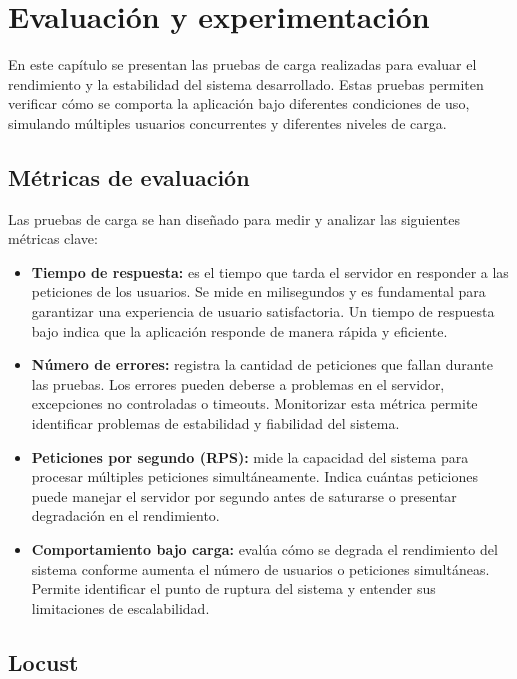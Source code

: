 \chapter{Evaluación y experimentación}

En este capítulo se presentan las pruebas de carga realizadas para evaluar el rendimiento y la estabilidad del sistema desarrollado. Estas pruebas permiten verificar 
cómo se comporta la aplicación bajo diferentes condiciones de uso, simulando múltiples usuarios concurrentes y diferentes niveles de carga.

\section{Métricas de evaluación}

Las pruebas de carga se han diseñado para medir y analizar las siguientes métricas clave:

\begin{itemize}
    \item \textbf{Tiempo de respuesta:} es el tiempo que tarda el servidor en responder a las peticiones de los usuarios. Se mide en milisegundos y es fundamental para 
    garantizar una experiencia de usuario satisfactoria. Un tiempo de respuesta bajo indica que la aplicación responde de manera rápida y eficiente.
    
    \item \textbf{Número de errores:} registra la cantidad de peticiones que fallan durante las pruebas. Los errores pueden deberse a problemas en el servidor, excepciones 
    no controladas o timeouts. Monitorizar esta métrica permite identificar problemas de estabilidad y fiabilidad del sistema.
    
    \item \textbf{Peticiones por segundo (RPS):} mide la capacidad del sistema para procesar múltiples peticiones simultáneamente. Indica cuántas peticiones puede manejar 
    el servidor por segundo antes de saturarse o presentar degradación en el rendimiento.
    
    \item \textbf{Comportamiento bajo carga:} evalúa cómo se degrada el rendimiento del sistema conforme aumenta el número de usuarios o peticiones simultáneas. Permite 
    identificar el punto de ruptura del sistema y entender sus limitaciones de escalabilidad.
\end{itemize}

\section{Locust}

